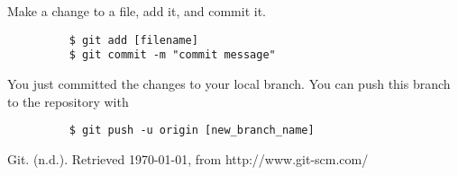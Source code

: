 \documentclass[11pt]{report}
\begin{document}
Make a change to a file, add it, and commit it.

\begin{figure}[H]
  \begin{lstlisting}
    $ git add [filename]
    $ git commit -m "commit message"
    \end{lstlisting}
\end{figure}

You just committed the changes to your local branch.  You can push
this branch to the repository with

\begin{figure}[H]
  \begin{lstlisting}
    $ git push -u origin [new_branch_name]
  \end{lstlisting}
\end{figure}

\begin{thebibliography}{9}

    Git. (n.d.). Retrieved \today, from http://www.git-scm.com/

\end{thebibliography}
\end{document}
